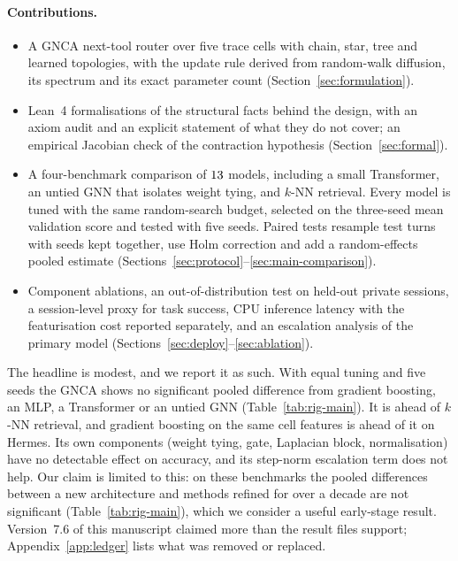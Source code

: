 \documentclass[10pt,twocolumn,letterpaper]{article}
\begin{document}
\paragraph{Contributions.}
\begin{itemize}[leftmargin=1.2em, itemsep=0.1em]
  \item A GNCA next-tool router over five trace cells with chain, star, tree and learned topologies, with the update rule derived from random-walk diffusion, its spectrum and its exact parameter count (Section~\ref{sec:formulation}).
  \item Lean~4 formalisations of the structural facts behind the design, with an axiom audit and an explicit statement of what they do not cover; an empirical Jacobian check of the contraction hypothesis (Section~\ref{sec:formal}).
  \item A four-benchmark comparison of $13$ models, including a small Transformer, an untied GNN that isolates weight tying, and $k$-NN retrieval. Every model is tuned with the same random-search budget, selected on the three-seed mean validation score and tested with five seeds. Paired tests resample test turns with seeds kept together, use Holm correction and add a random-effects pooled estimate (Sections~\ref{sec:protocol}--\ref{sec:main-comparison}).
  \item Component ablations, an out-of-distribution test on held-out private sessions, a session-level proxy for task success, CPU inference latency with the featurisation cost reported separately, and an escalation analysis of the primary model (Sections~\ref{sec:deploy}--\ref{sec:ablation}).
\end{itemize}
The headline is modest, and we report it as such. With equal tuning and five seeds the GNCA shows no significant pooled difference from gradient boosting, an MLP, a Transformer or an untied GNN (Table~\ref{tab:rig-main}). It is ahead of $k$-NN retrieval, and gradient boosting on the same cell features is ahead of it on Hermes. Its own components (weight tying, gate, Laplacian block, normalisation) have no detectable effect on accuracy, and its step-norm escalation term does not help. Our claim is limited to this: on these benchmarks the pooled differences between a new architecture and methods refined for over a decade are not significant (Table~\ref{tab:rig-main}), which we consider a useful early-stage result. Version~7.6 of this manuscript claimed more than the result files support; Appendix~\ref{app:ledger} lists what was removed or replaced.
\end{document}
